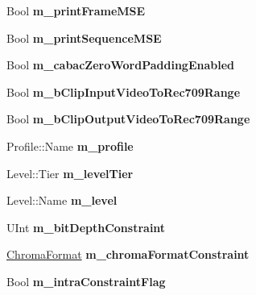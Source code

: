 \begin{DoxyCompactItemize}
Bool {\bfseries m\+\_\+print\+Frame\+M\+SE}
\item 
\mbox{\label{class_t_app_enc_cfg_a87a1ea3f27e5021a14f367d71261b05c}} 
Bool {\bfseries m\+\_\+print\+Sequence\+M\+SE}
\item 
\mbox{\label{class_t_app_enc_cfg_a1552f30e2aa425921277142540e3e822}} 
Bool {\bfseries m\+\_\+cabac\+Zero\+Word\+Padding\+Enabled}
\item 
\mbox{\label{class_t_app_enc_cfg_a7815fb635685b62814e164dde3674e49}} 
Bool {\bfseries m\+\_\+b\+Clip\+Input\+Video\+To\+Rec709\+Range}
\item 
\mbox{\label{class_t_app_enc_cfg_ab52d52138d0a3525209cf1f6b3f9ca59}} 
Bool {\bfseries m\+\_\+b\+Clip\+Output\+Video\+To\+Rec709\+Range}
\item 
\mbox{\label{class_t_app_enc_cfg_ad8c76951bec4c04b281a6ee390421157}} 
Profile\+::\+Name {\bfseries m\+\_\+profile}
\item 
\mbox{\label{class_t_app_enc_cfg_a66c31fc75dea809f71d6766235f15ff0}} 
Level\+::\+Tier {\bfseries m\+\_\+level\+Tier}
\item 
\mbox{\label{class_t_app_enc_cfg_a6c7bb3c7bc00c7d6df5ca21bc34c08b8}} 
Level\+::\+Name {\bfseries m\+\_\+level}
\item 
\mbox{\label{class_t_app_enc_cfg_a386c4013419555464f04eae205095de6}} 
U\+Int {\bfseries m\+\_\+bit\+Depth\+Constraint}
\item 
\mbox{\label{class_t_app_enc_cfg_ac160ee5c1f4679c93ff7d07dc903b0c4}} 
\hyperlink{_type_def_8h_a4a6c51c10f2eb04abc7209db7caff39f}{Chroma\+Format} {\bfseries m\+\_\+chroma\+Format\+Constraint}
\item 
\mbox{\label{class_t_app_enc_cfg_aacb275d67cde4b7a43bef0a0b27bd497}} 
Bool {\bfseries m\+\_\+intra\+Constraint\+Flag}
\item 
\mbox{\label{class_t_app_enc_cfg_ab9a7dcd1eec00b38b8adfb91cfa27eee}} 

\end{DoxyCompactItemize}

